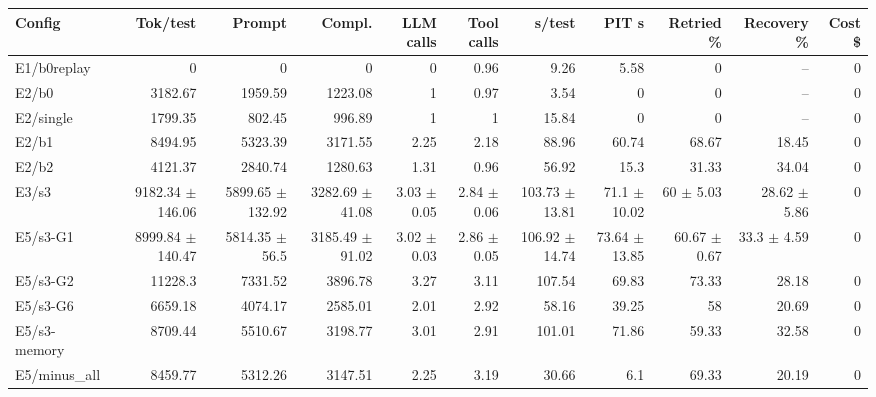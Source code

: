 \begin{tabular}{lrrrrrrrrrr}
\toprule
Config & Tok/test & Prompt & Compl. & LLM calls & Tool calls & s/test & PIT s & Retried \% & Recovery \% & Cost \$ \\
\midrule
E1/b0replay & 0 & 0 & 0 & 0 & 0.96 & 9.26 & 5.58 & 0 & -- & 0 \\
E2/b0 & 3182.67 & 1959.59 & 1223.08 & 1 & 0.97 & 3.54 & 0 & 0 & -- & 0 \\
E2/single & 1799.35 & 802.45 & 996.89 & 1 & 1 & 15.84 & 0 & 0 & -- & 0 \\
E2/b1 & 8494.95 & 5323.39 & 3171.55 & 2.25 & 2.18 & 88.96 & 60.74 & 68.67 & 18.45 & 0 \\
E2/b2 & 4121.37 & 2840.74 & 1280.63 & 1.31 & 0.96 & 56.92 & 15.3 & 31.33 & 34.04 & 0 \\
E3/s3 & 9182.34 $\pm$ 146.06 & 5899.65 $\pm$ 132.92 & 3282.69 $\pm$ 41.08 & 3.03 $\pm$ 0.05 & 2.84 $\pm$ 0.06 & 103.73 $\pm$ 13.81 & 71.1 $\pm$ 10.02 & 60 $\pm$ 5.03 & 28.62 $\pm$ 5.86 & 0 \\
E5/s3-G1 & 8999.84 $\pm$ 140.47 & 5814.35 $\pm$ 56.5 & 3185.49 $\pm$ 91.02 & 3.02 $\pm$ 0.03 & 2.86 $\pm$ 0.05 & 106.92 $\pm$ 14.74 & 73.64 $\pm$ 13.85 & 60.67 $\pm$ 0.67 & 33.3 $\pm$ 4.59 & 0 \\
E5/s3-G2 & 11228.3 & 7331.52 & 3896.78 & 3.27 & 3.11 & 107.54 & 69.83 & 73.33 & 28.18 & 0 \\
E5/s3-G6 & 6659.18 & 4074.17 & 2585.01 & 2.01 & 2.92 & 58.16 & 39.25 & 58 & 20.69 & 0 \\
E5/s3-memory & 8709.44 & 5510.67 & 3198.77 & 3.01 & 2.91 & 101.01 & 71.86 & 59.33 & 32.58 & 0 \\
E5/minus\_all & 8459.77 & 5312.26 & 3147.51 & 2.25 & 3.19 & 30.66 & 6.1 & 69.33 & 20.19 & 0 \\
\bottomrule
\end{tabular}
